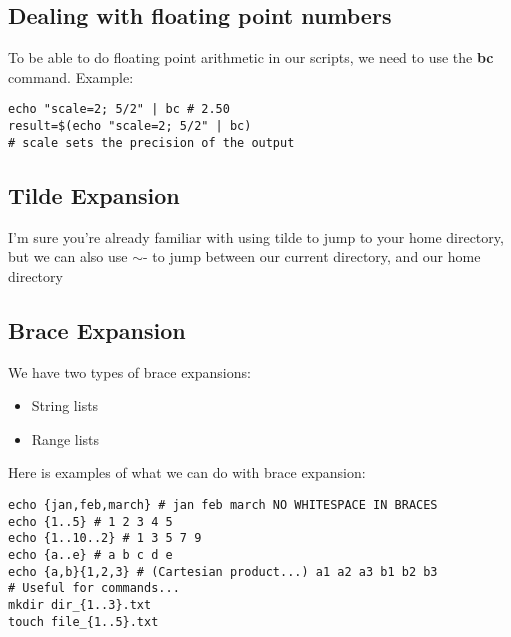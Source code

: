 \documentclass{report}
\begin{document}
    \bigbreak \noindent 
    \subsection{Dealing with floating point numbers}
    \bigbreak \noindent 
    To be able to do floating point arithmetic in our scripts, we need to use the \textbf{bc} command.
    \bigbreak \noindent 
    Example:
    \begin{mdframed}[style=purplebox]
    \begin{verbatim}
echo "scale=2; 5/2" | bc # 2.50
result=$(echo "scale=2; 5/2" | bc)
# scale sets the precision of the output
    \end{verbatim}
    \bigbreak \noindent
    \end{mdframed}
    \bigbreak \noindent 

    \pagebreak \bigbreak \noindent 
    \subsection{Tilde Expansion}
    \bigbreak \noindent 
    I'm sure you're already familiar with using tilde to jump to your home directory, but we can also use $\sim$- to jump between our current directory, and our home directory

    \bigbreak \noindent 
    \subsection{Brace Expansion}
    \bigbreak \noindent 
    We have two types of brace expansions:
    \begin{itemize}
        \item String lists
        \item Range lists
    \end{itemize}
    \bigbreak \noindent 
    Here is examples of what we can do with brace expansion:
    \bigbreak \noindent 
    \begin{mdframed}[style=purplebox]
    \begin{verbatim}
echo {jan,feb,march} # jan feb march NO WHITESPACE IN BRACES
echo {1..5} # 1 2 3 4 5
echo {1..10..2} # 1 3 5 7 9
echo {a..e} # a b c d e
echo {a,b}{1,2,3} # (Cartesian product...) a1 a2 a3 b1 b2 b3
# Useful for commands...
mkdir dir_{1..3}.txt
touch file_{1..5}.txt
    \end{verbatim}
    \bigbreak \noindent
    \end{mdframed}

    \pagebreak \bigbreak \noindent 
\end{document}
